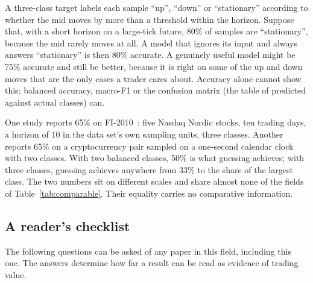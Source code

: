 \begin{example}
\label{ex:imbalance}
A three-class target labels each sample ``up'', ``down'' or ``stationary'' according to whether
the mid moves by more than a threshold within the horizon. Suppose that, with a short horizon on a
large-tick future, 80\% of samples are ``stationary'', because the mid rarely moves at all. A model
that ignores its input and always answers ``stationary'' is then 80\% accurate. A genuinely useful
model might be 75\% accurate and still be better, because it is right on some of the up and down
moves that are the only cases a trader cares about. Accuracy alone cannot show this; balanced
accuracy, macro-F1 or the confusion matrix (the table of predicted against actual classes) can.
\end{example}

\begin{example}
One study reports 65\% on FI-2010~\citep{ntakaris2018}: five Nasdaq Nordic stocks, ten trading
days, a horizon of $10$ in the data set's own sampling units, three classes. Another reports 65\% on a cryptocurrency pair sampled
on a one-second calendar clock with two classes. With two balanced classes, 50\% is what guessing
achieves; with three classes, guessing achieves anywhere from 33\% to the share of the largest
class. The two numbers sit on different scales and share almost none of the fields of
Table~\ref{tab:comparable}. Their equality carries no comparative information.
\end{example}

\subsection{A reader's checklist}
\label{sec:checklist}

The following questions can be asked of any paper in this field, including this one. The answers
determine how far a result can be read as evidence of trading value.

